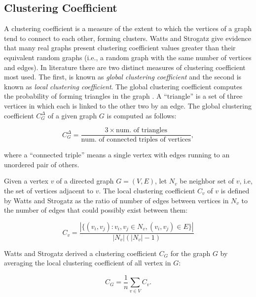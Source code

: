 \subsection*{Clustering Coefficient}  
\label{subsec:clust_coef}
A clustering coefficient is a measure of the extent to which the vertices of a graph  tend to connect to each other, forming clusters. Watts and Strogatz \cite{Watts1998} give evidence that many real graphs present  clustering coefficient  values greater than their  equivalent random graphs (i.e., a random graph with the same number of vertices and edges). In literature there are two distinct measures of clustering coefficient most used.  The first, is known as {\em global clustering coefficient} and the second is known as {\em local clustering coefficient}. The global clustering coefficient  computes the probability  of forming triangles in the graph \cite{Newman2003}. A ``triangle'' is a set of three vertices in which each is linked to the other two by an edge. The global clustering coefficient $C_G^\Delta$ of a given graph $G$ is computed as follows:

\begin{equation}
\label{eq:globClustCoef}
    C_G^\Delta = \frac{3\times \textrm{num. of triangles}}{\textrm{num. of connected triples of vertices}},
\end{equation}

where a ``connected triple'' means a single vertex with edges running to an unordered pair of others.

Given a vertex $v$ of a directed  graph $G=(V,E)$, let $N_v$ be neighbor set of $v$, i.e, the set of vertices adjacent to $v$. The local clustering coefficient $C_v$ of $v$ is defined by Watts and Strogatz \cite{Watts1998} as the ratio of number of edges between vertices in $N_v$ to the  number of edges that could possibly exist between them:

\begin{equation}
\label{eq:locClustCoef}
    C_v = \frac{|\{(v_i,v_j): v_i,v_j \in N_v, (v_i,v_j)\in E\}|}{|N_v|(|N_v|-1)}
\end{equation}

Watts and Strogatz  derived a clustering coefficient $C_G$ for the graph $G$ by averaging the local clustering coefficient of all vertex in $G$:

\begin{equation}
\label{eq:wsClustCoef}
    C_G= \frac{1}{n}\sum_{v \in V} C_v.
\end{equation}

